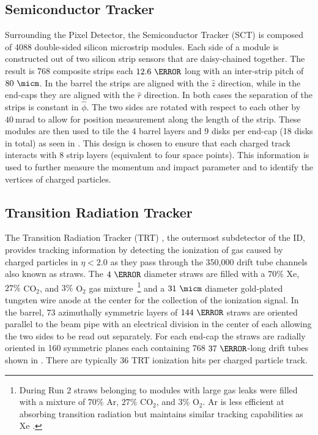 \subsection{Semiconductor Tracker}

Surrounding the Pixel Detector, the Semiconductor Tracker (SCT)
\cite{PERF-2007-01} is composed of 4088 double-sided silicon microstrip modules.
Each side of a module is constructed out of two silicon strip sensors
that are daisy-chained together.  The result is 768 composite strips each
$12.6~\cm$ long with an inter-strip pitch of $80~\micm$. In the barrel the
strips are aligned with the $\hat{z}$ direction, while in the end-caps they are
aligned with the $\hat{r}$ direction. In both cases the separation of the
strips is constant in $\hat{\phi}$. The two sides are rotated with respect to
each other by $40~\text{mrad}$ to allow for position measurement along the
length of the strip.  These modules are then used to tile the 4 barrel layers
and 9 disks per end-cap (18 disks in total) as seen in
.  This design is chosen to ensure that each
charged track interacts with 8 strip layers (equivalent to four space points).
This information is used to further measure the momentum and impact parameter
and to identify the vertices of charged particles.

\subsection{Transition Radiation Tracker}

The Transition Radiation Tracker (TRT) \cite{PERF-2007-01}, the outermost
subdetector of the ID, provides tracking information by detecting the
ionization of gas caused by charged particles in $\eta < 2.0$ as they pass
through the 350,000 drift tube channels also known as straws.  The $4~\mm$
diameter straws are filled with a $70\%$ Xe, $27\%$ CO$_2$, and $3\%$ O$_2$ gas
mixture~\footnote{During Run 2 straws belonging to modules with large gas leaks
were filled with a mixture of $70\%$ Ar, $27\%$ CO$_2$, and $3\%$ O$_2$.  Ar is
less efficient at absorbing transition radiation but maintains similar tracking
capabilities as Xe \cite{Aaboud:2017odu}.} and a $31~\micm$ diameter
gold-plated tungsten wire anode at the center for the collection of the
ionization signal.  In the barrel, 73 azimuthally symmetric layers of $144~\cm$
straws are oriented parallel to the beam pipe with an electrical division in
the center of each allowing the two sides to be read out separately.  For each
end-cap the straws are radially oriented in 160 symmetric planes each containing
768 $37~\cm$-long drift tubes shown in .
There are typically 36 TRT ionization hits per charged particle track. 

